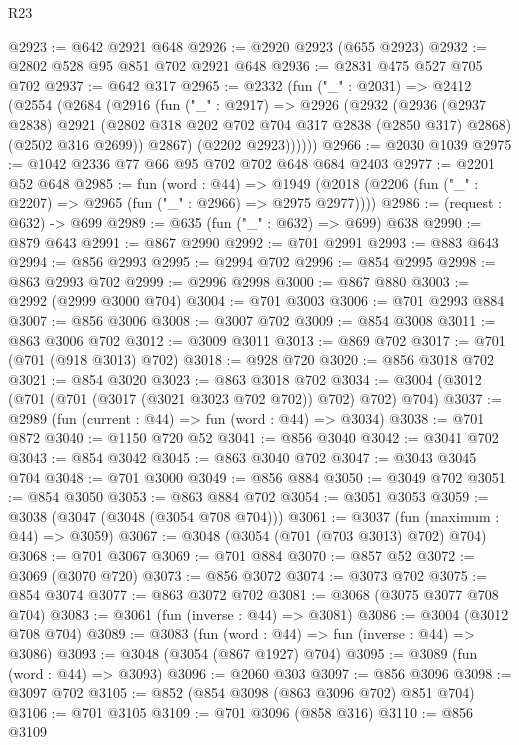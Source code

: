 \begin{lexlean}{R23}
\begin{coremodule}
@2923 := @642 @2921 @648
@2926 := @2920 @2923 (@655 @2923)
@2932 := @2802 @528 @95 @851 @702 @2921 @648
@2936 := @2831 @475 @527 @705 @702
@2937 := @642 @317
@2965 := @2332
    (fun ("_" : @2031) =>
    @2412
      (@2554
        (@2684
          (@2916
            (fun ("_" : @2917) =>
            @2926
              (@2932
                (@2936
                  (@2937 @2838)
                  @2921
                  (@2802 @318 @202 @702 @704 @317 @2838 (@2850 @317) @2868)
                  (@2502 @316 @2699))
                @2867)
              (@2202 @2923))))))
@2966 := @2030 @1039
@2975 := @1042 @2336 @77 @66 @95 @702 @702 @648 @684 @2403
@2977 := @2201 @52 @648
@2985 := fun (word : @44) =>
  @1949 (@2018 (@2206 (fun ("_" : @2207) => @2965 (fun ("_" : @2966) => @2975 @2977))))
@2986 := (request : @632) -> @699
@2989 := @635 (fun ("_" : @632) => @699) @638
@2990 := @879 @643
@2991 := @867 @2990
@2992 := @701 @2991
@2993 := @883 @643
@2994 := @856 @2993
@2995 := @2994 @702
@2996 := @854 @2995
@2998 := @863 @2993 @702
@2999 := @2996 @2998
@3000 := @867 @880
@3003 := @2992 (@2999 @3000 @704)
@3004 := @701 @3003
@3006 := @701 @2993 @884
@3007 := @856 @3006
@3008 := @3007 @702
@3009 := @854 @3008
@3011 := @863 @3006 @702
@3012 := @3009 @3011
@3013 := @869 @702
@3017 := @701 (@701 (@918 @3013) @702)
@3018 := @928 @720
@3020 := @856 @3018 @702
@3021 := @854 @3020
@3023 := @863 @3018 @702
@3034 := @3004 (@3012 (@701 (@701 (@3017 (@3021 @3023 @702 @702)) @702) @702) @704)
@3037 := @2989 (fun (current : @44) => fun (word : @44) => @3034)
@3038 := @701 @872
@3040 := @1150 @720 @52
@3041 := @856 @3040
@3042 := @3041 @702
@3043 := @854 @3042
@3045 := @863 @3040 @702
@3047 := @3043 @3045 @704
@3048 := @701 @3000
@3049 := @856 @884
@3050 := @3049 @702
@3051 := @854 @3050
@3053 := @863 @884 @702
@3054 := @3051 @3053
@3059 := @3038 (@3047 (@3048 (@3054 @708 @704)))
@3061 := @3037 (fun (maximum : @44) => @3059)
@3067 := @3048 (@3054 (@701 (@703 @3013) @702) @704)
@3068 := @701 @3067
@3069 := @701 @884
@3070 := @857 @52
@3072 := @3069 (@3070 @720)
@3073 := @856 @3072
@3074 := @3073 @702
@3075 := @854 @3074
@3077 := @863 @3072 @702
@3081 := @3068 (@3075 @3077 @708 @704)
@3083 := @3061 (fun (inverse : @44) => @3081)
@3086 := @3004 (@3012 @708 @704)
@3089 := @3083 (fun (word : @44) => fun (inverse : @44) => @3086)
@3093 := @3048 (@3054 (@867 @1927) @704)
@3095 := @3089 (fun (word : @44) => @3093)
@3096 := @2060 @303
@3097 := @856 @3096
@3098 := @3097 @702
@3105 := @852 (@854 @3098 (@863 @3096 @702) @851 @704)
@3106 := @701 @3105
@3109 := @701 @3096 (@858 @316)
@3110 := @856 @3109

\end{coremodule}
\end{lexlean}
